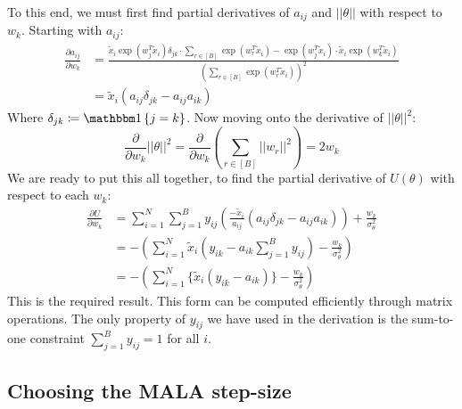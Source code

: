 To this end, we must first find partial derivatives of $a_{ij}$ and $||\theta||$ with respect to $w_k$. Starting with $a_{ij}$:
%
\begin{align}
	\frac{\partial a_{ij}}{\partial w_k} &= \frac
	{\tilde{x}_i \exp(w_j^T \tilde{x}_i) \delta_{jk} \cdot \sum_{r \in [B]} \exp(w_r^T \tilde{x}_i) 
		- 
		\exp(w_j^T \tilde{x}_i) \cdot \tilde{x}_i \exp(w_k^T \tilde{x}_i)}
	{\left( \sum_{r \in [B]} \exp(w_r^T \tilde{x}_i) \right)^2} \nonumber \\
	&= \tilde{x}_i \left( a_{ij} \delta_{jk} - a_{ij}a_{ik} \right) 
\end{align}
%
Where $\delta_{jk} \coloneqq \one \left\{ j = k \right\}$. Now moving onto the derivative of $||\theta||^2$:
%
\begin{equation}
	\frac{ \partial}{\partial w_k} ||\theta||^2 = \frac{\partial}{\partial w_k} \left( \sum_{r \in [B]} ||w_r||^2 \right) = 2w_k
\end{equation}
%
We are ready to put this all together, to find the partial derivative of $U(\theta)$ with respect to each $w_k$:
\begin{align}
	\frac{\partial U}{\partial w_k} &= 
	\sum_{i=1}^{N} \sum_{j=1}^{B} y_{ij} 
	\left( \frac{-\tilde{x}_i}{a_{ij}} \left( a_{ij} \delta_{jk} - a_{ij} a_{ik} \right) \right)
	+ \frac{w_k}{\sigma_\theta^2} \nonumber \\
	&=  - \left( \sum_{i=1}^{N} \tilde{x}_i \left( y_{ik} - a_{ik} \sum_{j=1}^{B} y_{ij} \right)
	- \frac{w_k}{\sigma_\theta^2} \right) \nonumber \\
	&= - \left( \sum_{i=1}^{N} \Big\{ \tilde{x}_i (y_{ik} - a_{ik}) \Big\} - \frac{w_k}{\sigma_\theta^2} \right)
\end{align}
%
This is the required result. This form can be computed efficiently through matrix operations. The only property of $y_{ij}$ we have used in the derivation is the sum-to-one constraint $\sum_{j=1}^{B} y_{ij} = 1$ for all $i$.

\subsection{Choosing the MALA step-size}
\label{appdx:step-size}

